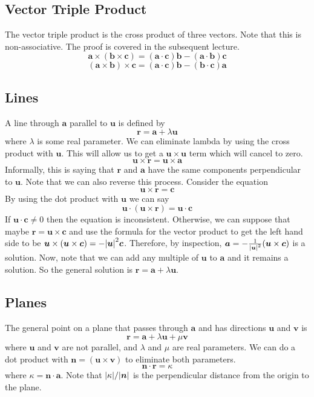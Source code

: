 \documentclass{article}
\begin{document}
	\subsection{Vector Triple Product}
	The vector triple product is the cross product of three vectors. Note that this is non-associative. The proof is covered in the subsequent lecture.
	\[ \bm a \times (\bm b \times \bm c) = (\bm a \cdot \bm c) \bm b - (\bm a\cdot \bm b) \bm c \]
	\[ (\bm a \times \bm b) \times \bm c = (\bm a \cdot \bm c) \bm b - (\bm b\cdot \bm c) \bm a \]
	
	\subsection{Lines}
	A line through $\bm a$ parallel to $\bm u$ is defined by
	\[ \bm r = \bm a + \lambda \bm u \]
	where $\lambda$ is some real parameter. We can eliminate lambda by using the cross product with $\bm u$. This will allow us to get a $\bm u \times \bm u$ term which will cancel to zero.
	\[ \bm u \times \bm r = \bm u \times \bm a \]
	Informally, this is saying that $\bm r$ and $\bm a$ have the same components perpendicular to $\bm u$. Note that we can also reverse this process. Consider the equation
	\[ \bm u \times \bm r = \bm c \]
	By using the dot product with $\bm u$ we can say
	\[ \bm u \cdot (\bm u \times \bm r) = \bm u \cdot \bm c \]
	If $\bm u \cdot \bm c \neq 0$ then the equation is inconsistent. Otherwise, we can suppose that maybe $\bm r = \bm u \times \bm c$ and use the formula for the vector product to get the left hand side to be $\bm u \times (\bm u \times \bm c) = -\abs{\bm u}^2 \bm c$. Therefore, by inspection, $\bm a = -\frac{1}{\abs{\bm u}^2}(\bm u \times \bm c)$ is a solution. Now, note that we can add any multiple of $\bm u$ to $\bm a$ and it remains a solution. So the general solution is $\bm r = \bm a + \lambda\bm u$.
	
	\subsection{Planes}
	The general point on a plane that passes through $\bm a$ and has directions $\bm u$ and $\bm v$ is
	\[ \bm r = \bm a + \lambda \bm u + \mu \bm v \]
	where $\bm u$ and $\bm v$ are not parallel, and $\lambda$ and $\mu$ are real parameters. We can do a dot product with $\bm n = (\bm u \times \bm v)$ to eliminate both parameters.
	\[ \bm n \cdot \bm r = \kappa \]
	where $\kappa = \bm n \cdot \bm a$. Note that $\abs{\kappa}/\abs{\bm n}$ is the perpendicular distance from the origin to the plane.
	
\end{document}
